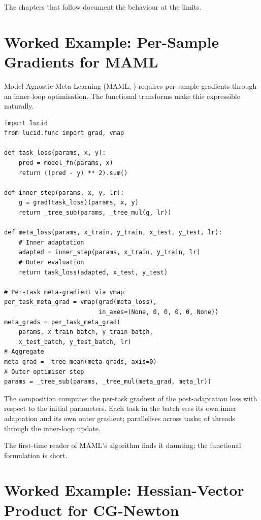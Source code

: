 The chapters that follow  document the
behaviour at the limits.

\section{Worked Example: Per-Sample Gradients for MAML}
\label{sec:higher_order:maml}

Model-Agnostic Meta-Learning (MAML, \cite{finn_maml_2017})
requires per-sample gradients through an inner-loop optimisation. The functional transforms
make this expressible naturally.

\begin{lstlisting}[style=lucid,language=LucidPython]
import lucid
from lucid.func import grad, vmap

def task_loss(params, x, y):
    pred = model_fn(params, x)
    return ((pred - y) ** 2).sum()

def inner_step(params, x, y, lr):
    g = grad(task_loss)(params, x, y)
    return _tree_sub(params, _tree_mul(g, lr))

def meta_loss(params, x_train, y_train, x_test, y_test, lr):
    # Inner adaptation
    adapted = inner_step(params, x_train, y_train, lr)
    # Outer evaluation
    return task_loss(adapted, x_test, y_test)

# Per-task meta-gradient via vmap
per_task_meta_grad = vmap(grad(meta_loss),
                          in_axes=(None, 0, 0, 0, 0, None))
meta_grads = per_task_meta_grad(
    params, x_train_batch, y_train_batch,
    x_test_batch, y_test_batch, lr)
# Aggregate
meta_grad = _tree_mean(meta_grads, axis=0)
# Outer optimiser step
params = _tree_sub(params, _tree_mul(meta_grad, meta_lr))
\end{lstlisting}

The composition  computes the per-task
gradient of the post-adaptation loss with respect to the initial
parameters. Each task in the batch sees its own inner adaptation
and its own outer gradient;  parallelises across
tasks;  of  threads through the
inner-loop update.

The first-time reader of MAML's algorithm finds it daunting;
the functional formulation is short.

\section{Worked Example: Hessian-Vector Product for CG-Newton}
\label{sec:higher_order:hvp_cg}

